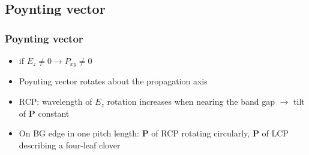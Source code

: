 \documentclass{beamer}
\renewcommand{\vec}{\mathbf}
\newenvironment{slide}[1]{\subsection{#1}\begin{frame}\frametitle{#1}}{\end{frame}}
\begin{document}
\begin{slide}{Poynting vector}
\vspace{-0.7cm}
\begin{itemize}
  \item if $E_z \neq 0 \rightarrow P_{xy} \neq 0$
  \item Poynting vector rotates about the propagation axis
  \item<1> RCP: wavelength of $E_z$ rotation increases when nearing the band gap $\rightarrow$ tilt of $\vec{P}$ constant
  
  
  \vspace{-4.4cm}
  \item<2> On BG edge in one pitch length: $\vec{P}$ of RCP rotating circularly, $\vec{P}$ of LCP describing a four-leaf clover


\end{itemize}
\end{slide}


\end{document}
